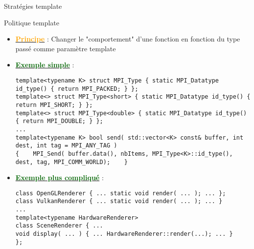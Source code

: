 \documentclass[compress,10pt,aspectratio=169]{beamer}
\begin{document}
\begin{frame}[fragile]{Stratégies template}
  \scriptsize\vspace*{-3mm}
  \begin{block}{\small Politique template}
  \begin{itemize}
  \item \underline{\textcolor{orange}{\bf Principe}} : Changer le "comportement" d'une fonction en fonction du type passé comme paramètre template
  \item \underline{\textcolor{DarkGreen}{\bf Exemple simple}} : 
\begin{verbatim}
template<typename K> struct MPI_Type { static MPI_Datatype id_type() { return MPI_PACKED; } };
template<> struct MPI_Type<short> { static MPI_Datatype id_type() { return MPI_SHORT; } };
template<> struct MPI_Type<double> { static MPI_Datatype id_type() { return MPI_DOUBLE; } };
...
template<typename K> bool send( std::vector<K> const& buffer, int dest, int tag = MPI_ANY_TAG )
{    MPI_Send( buffer.data(), nbItems, MPI_Type<K>::id_type(), dest, tag, MPI_COMM_WORLD);    }
\end{verbatim}
  \item \underline{\textcolor{DarkGreen}{\bf Exemple plus compliqué}} :
\begin{verbatim}
class OpenGLRenderer { ... static void render( ... ); ... };
class VulkanRenderer { ... static void render( ... ); ... }
... 
template<typename HardwareRenderer>
class SceneRenderer { ... 
void display( ... ) { ... HardwareRenderer::render(...); ... }
};
\end{verbatim}
\end{itemize}
\end{block}
\end{frame}
  
\end{document}

